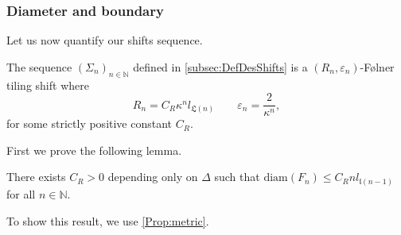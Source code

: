 \documentclass[english, 11pt, a4paper]{article}
\theoremstyle{definition}
\numberwithin{equation}{section}
\newcommand{\bN}{\mathbb{N}}
\newcommand{\diam}[1]{\mathrm{diam}\left( {#1} \right)}
\newcommand{\BZ}{\Delta}
\newcommand{\landing}{\mathfrak{l}}
\newcommand{\Landing}{\mathfrak{L}}
\newcommand{\Cdiam}{C_R}
\begin{document}
\subsubsection{Diameter and boundary}
Let us now quantify our shifts sequence.

\begin{Prop}\label{Lmm:RkEpskTn}
  The sequence $(\Sigma_n)_{n\in \bN}$ defined in \cref{subsec:DefDesShifts} is a
  $(R_n,\varepsilon_n)$-Følner tiling shift where
  \begin{equation*}
    R_n=\Cdiam \kappa^n l_{\Landing (n)} \qquad \varepsilon_n=\frac{2}{\kappa^{n}},
  \end{equation*}
  for some strictly positive constant $\Cdiam$.
\end{Prop}

First we prove the following lemma.
\begin{Lmm}\label{Lmm:DiamFn}
  There exists $\Cdiam>0$ depending only on $\BZ$ such that
  $\diam{F_n} \leq \Cdiam n l_{\landing(n-1)}$  for all $n\in \bN$.  
\end{Lmm}
To show this result, we use \cref{Prop:metric}.
\end{document}
